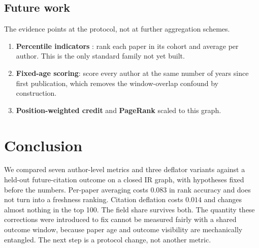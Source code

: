 \documentclass{article}
\begin{document}
\subsection{Future work}

The evidence points at the protocol, not at further aggregation schemes.
\begin{enumerate}
  \item \textbf{Percentile indicators} \citep{waltman2016review, waltman2013percentile}: rank each paper in its
    cohort and average per author. This is the only standard family not yet built.
  \item \textbf{Fixed-age scoring}: score every author at the same number of years since first
    publication, which removes the window-overlap confound by construction.
  \item \textbf{Position-weighted credit} \citep{vavrycuk2018influential} and \textbf{PageRank}
    \citep{ding2011pagerank} scaled to this graph.
\end{enumerate}

\section{Conclusion}

We compared seven author-level metrics and three deflator variants against a held-out
future-citation outcome on a closed IR graph, with hypotheses fixed before the numbers. Per-paper
averaging costs $0.083$ in rank accuracy and does not turn into a freshness ranking. Citation
deflation costs $0.014$ and changes almost nothing in the top 100. The field share survives both.
The quantity these corrections were introduced to fix cannot be measured fairly with a shared
outcome window, because paper age and outcome visibility are mechanically entangled. The next
step is a protocol change, not another metric.

\medskip


\end{document}

